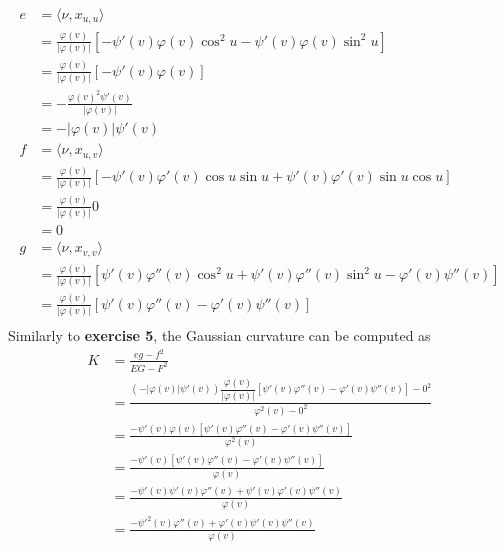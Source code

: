 \documentclass[a4paper]{report}
\begin{document}
\begin{align}
e &= \langle \nu, x_{u,u} \rangle\\
&= \frac{\varphi(v)}{\lvert \varphi(v) \rvert} \left[- \psi'(v) \varphi(v) \cos^2 u - \psi'(v) \varphi(v) \sin^2 u \right] \\
&= \frac{\varphi(v)}{\lvert \varphi(v) \rvert} \left[- \psi'(v) \varphi(v) \right] \\
&= -\frac{\varphi(v)^2\psi'(v)}{\lvert \varphi(v) \rvert} \\
&= -\lvert \varphi(v) \rvert\psi'(v) \\
f &= \langle \nu, x_{u,v} \rangle \\
&= \frac{\varphi(v)}{\lvert \varphi(v) \rvert} \left[- \psi'(v) \varphi'(v) \cos u \sin u + \psi'(v) \varphi'(v) \sin u \cos u \right] \\
&= \frac{\varphi(v)}{\lvert \varphi(v) \rvert} 0\\
&=  0\\
g &= \langle \nu, x_{v,v} \rangle \\
&= \frac{\varphi(v)}{\lvert \varphi(v) \rvert} \left[\psi'(v) \varphi''(v) \cos^2 u  + \psi'(v) \varphi''(v) \sin^2 u - \varphi'(v) \psi''(v) \right] \\
&= \frac{\varphi(v)}{\lvert \varphi(v) \rvert} \left[\psi'(v) \varphi''(v) - \varphi'(v) \psi''(v) \right] \\
\end{align}
Similarly to \textbf{exercise 5}, the Gaussian curvature can be computed as
\begin{align}
K &= \frac{eg - f^2}{EG - F^2}\\
&= \frac{\left(-\lvert \varphi(v) \rvert\psi'(v)\right)\dfrac{\varphi(v)}{\lvert \varphi(v) \rvert} \left[\psi'(v) \varphi''(v) - \varphi'(v) \psi''(v) \right] - 0^2}{\varphi^2(v)  - 0^2}\\
&= \frac{-\psi'(v) \varphi(v) \left[\psi'(v) \varphi''(v) - \varphi'(v) \psi''(v) \right]}{\varphi^2(v)}\\
&= \frac{-\psi'(v) \left[\psi'(v) \varphi''(v) - \varphi'(v) \psi''(v) \right]}{\varphi(v)}\\
&= \frac{-\psi'(v) \psi'(v) \varphi''(v) + \psi'(v)  \varphi'(v) \psi''(v) }{\varphi(v)}\\
&= \frac{-{\psi'}^2(v) \varphi''(v) + \varphi'(v) \psi'(v)  \psi''(v) }{\varphi(v)} \label{7a_K}
\end{align}
\end{document}
